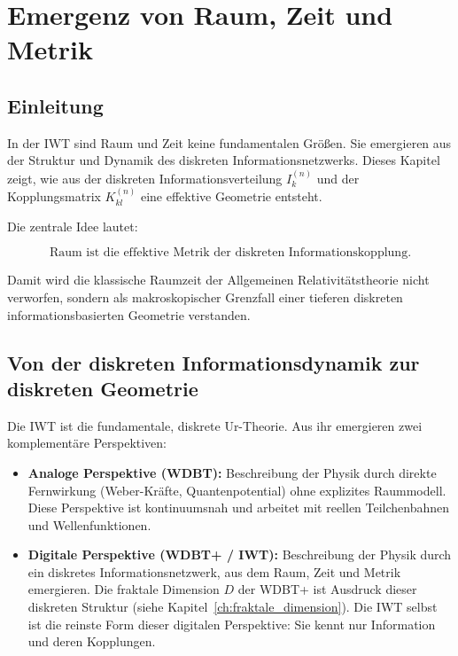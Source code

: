 
\chapter{Emergenz von Raum, Zeit und Metrik}
\label{ch:emergenz_raum_zeit}

\section{Einleitung}
\label{sec:emergenz_einleitung}

In der IWT sind Raum und Zeit keine fundamentalen Größen. Sie emergieren aus der Struktur und Dynamik des diskreten Informationsnetzwerks. Dieses Kapitel zeigt, wie aus der diskreten Informationsverteilung \( I_k^{(n)} \) und der Kopplungsmatrix \( K_{kl}^{(n)} \) eine effektive Geometrie entsteht.

Die zentrale Idee lautet:

\[
\text{Raum ist die effektive Metrik der diskreten Informationskopplung.}
\]

Damit wird die klassische Raumzeit der Allgemeinen Relativitätstheorie nicht verworfen, sondern als makroskopischer Grenzfall einer tieferen diskreten informationsbasierten Geometrie verstanden.

\section{Von der diskreten Informationsdynamik zur diskreten Geometrie}
\label{sec:diskrete_geometrie}

Die IWT ist die fundamentale, diskrete Ur-Theorie. Aus ihr emergieren zwei komplementäre Perspektiven:

\begin{itemize}
    \item \textbf{Analoge Perspektive (WDBT):}  
    Beschreibung der Physik durch direkte Fernwirkung (Weber-Kräfte, Quantenpotential) ohne explizites Raummodell. Diese Perspektive ist kontinuumsnah und arbeitet mit reellen Teilchenbahnen und Wellenfunktionen.
    
    \item \textbf{Digitale Perspektive (WDBT+ / IWT):}  
    Beschreibung der Physik durch ein diskretes Informationsnetzwerk, aus dem Raum, Zeit und Metrik emergieren. Die fraktale Dimension \( D \) der WDBT+ ist Ausdruck dieser diskreten Struktur (siehe Kapitel~\ref{ch:fraktale_dimension}). Die IWT selbst ist die reinste Form dieser digitalen Perspektive: Sie kennt nur Information und deren Kopplungen.
\end{itemize}

